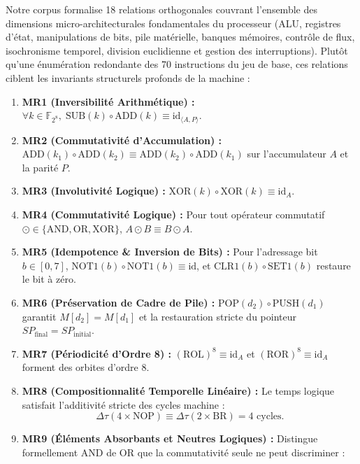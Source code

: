 \documentclass[10pt,journal,compsoc]{IEEEtran}
\begin{document}
Notre corpus formalise 18 relations orthogonales couvrant l'ensemble des dimensions micro-architecturales fondamentales du processeur (ALU, registres d'état, manipulations de bits, pile matérielle, banques mémoires, contrôle de flux, isochronisme temporel, division euclidienne et gestion des interruptions). Plutôt qu'une énumération redondante des 70 instructions du jeu de base, ces relations ciblent les invariants structurels profonds de la machine :
\begin{enumerate}
    \item \textbf{MR1 (Inversibilité Arithmétique) :} $\forall k \in \mathbb{F}_{2^8}, \; \text{SUB}(k) \circ \text{ADD}(k) \equiv \text{id}_{\langle A, P \rangle}$.
    \item \textbf{MR2 (Commutativité d'Accumulation) :} $\text{ADD}(k_1) \circ \text{ADD}(k_2) \equiv \text{ADD}(k_2) \circ \text{ADD}(k_1)$ sur l'accumulateur $A$ et la parité $P$.
    \item \textbf{MR3 (Involutivité Logique) :} $\text{XOR}(k) \circ \text{XOR}(k) \equiv \text{id}_A$.
    \item \textbf{MR4 (Commutativité Logique) :} Pour tout opérateur commutatif $\odot \in \{\text{AND}, \text{OR}, \text{XOR}\}$, $A \odot B \equiv B \odot A$.
    \item \textbf{MR5 (Idempotence \& Inversion de Bits) :} Pour l'adressage bit $b \in [0,7]$, $\text{NOT1}(b) \circ \text{NOT1}(b) \equiv \text{id}$, et $\text{CLR1}(b) \circ \text{SET1}(b)$ restaure le bit à zéro.
    \item \textbf{MR6 (Préservation de Cadre de Pile) :} $\text{POP}(d_2) \circ \text{PUSH}(d_1)$ garantit $M[d_2] = M[d_1]$ et la restauration stricte du pointeur $SP_{\text{final}} = SP_{\text{initial}}$.
    \item \textbf{MR7 (Périodicité d'Ordre 8) :} $(\text{ROL})^8 \equiv \text{id}_A$ et $(\text{ROR})^8 \equiv \text{id}_A$ forment des orbites d'ordre 8.
    \item \textbf{MR8 (Compositionnalité Temporelle Linéaire) :} Le temps logique satisfait l'additivité stricte des cycles machine :
    \begin{equation}
    \Delta \tau(4 \times \text{NOP}) \equiv \Delta \tau(2 \times \text{BR}) = 4 \text{ cycles}.
    \end{equation}
    \item \textbf{MR9 (Éléments Absorbants et Neutres Logiques) :} Distingue formellement $\text{AND}$ de $\text{OR}$ que la commutativité seule ne peut discriminer :
    \begin{equation}

\end{equation}
\end{enumerate}
\end{document}
